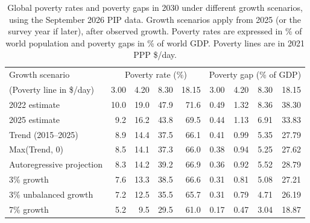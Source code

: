 \begin{table}[h]

\caption[Global poverty (rates and gaps) in 2030 under different growth scenarios (September 2026 PIP data).]{\label{tab:poverty_update}Global poverty rates and poverty gaps in 2030 under different growth scenarios, using the September 2026 PIP data. Growth scenarios apply from 2025 (or the survey year if later), after observed growth. Poverty rates are expressed in \% of world population and poverty gaps in \% of world GDP. Poverty lines are in 2021 PPP \$/day.}
\centering
\begin{tabular}[t]{lrrrrrrrr}
\toprule Growth scenario & \multicolumn{4}{c}{Poverty rate (\%)} & \multicolumn{4}{c}{Poverty gap (\% of GDP)} \\ 
 (Poverty line in \$/day)  & 3.00 & 4.20 & 8.30 & 18.15 & 3.00 & 4.20 & 8.30 & 18.15\\
\midrule
2022 estimate & 10.0 & 19.0 & 47.9 & 71.6 & 0.49 & 1.32 & 8.36 & 38.30\\
2025 estimate & 9.2 & 16.2 & 43.8 & 69.5 & 0.44 & 1.13 & 6.91 & 33.83\\
Trend (2015--2025) & 8.9 & 14.4 & 37.5 & 66.1 & 0.41 & 0.99 & 5.35 & 27.79\\
Max(Trend, 0) & 8.5 & 14.1 & 37.3 & 66.0 & 0.38 & 0.94 & 5.25 & 27.62\\
Autoregressive projection & 8.3 & 14.2 & 39.2 & 66.9 & 0.36 & 0.92 & 5.52 & 28.79\\
3\% growth & 7.6 & 13.3 & 38.5 & 66.6 & 0.31 & 0.81 & 5.08 & 27.21\\
3\% unbalanced growth & 7.2 & 12.5 & 35.5 & 65.7 & 0.31 & 0.79 & 4.71 & 26.19\\
7\% growth & 5.2 & 9.5 & 29.5 & 61.0 & 0.17 & 0.47 & 3.04 & 18.87\\
\bottomrule
\end{tabular}
\end{table}